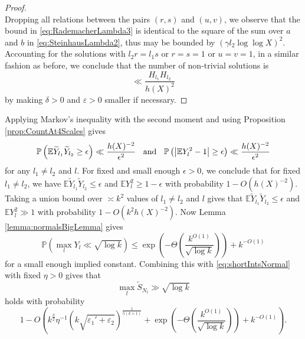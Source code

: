 \documentclass[11pt]{tran-l}
\theoremstyle{definition}
\theoremstyle{remark}
\numberwithin{equation}{section}
\begin{document}
\begin{proof}
\begin{equation}
     \end{equation}
     Dropping all relations between the pairs $(r, s)$ and $(u, v)$, we observe that the bound in \eqref{eq:RademacherLambda3} is identical to the square of the sum over $a$ and $b$ in \eqref{eq:SteinhausLambda2}, thus may be bounded by $(\gamma l_2\log\log X)^2$. Accounting for the solutions with $l_2r=l_1s$ or $r=s=1$ or $u=v=1$, in a similar fashion as before, we conclude that the number of non-trivial solutions is 
     \begin{equation}
         \ll \frac{H_{l_1}H_{l_2}}{h(X)^2}
     \end{equation} by making $\delta>0$ and $\varepsilon>0$ smaller if necessary. 
    \end{proof}

 Applying Markov's inequality with the second moment and using Proposition \ref{prop:CountAt4Scales} gives
    \begin{equation*}
        \mathbb P\left(\mathbb E\widetilde{Y}_{l_1}\widetilde{Y}_{l_2}\geq \epsilon \right)\ll \frac{h(X)^{-2}}{\epsilon^2} \hspace{0.2cm}\text{ and }\hspace{0.2cm} \mathbb P\left(\left\lvert \mathbb EY_l^2-1\right\rvert\geq\epsilon \right)\ll \frac{h(X)^{-2}}{\epsilon^2}
    \end{equation*}
    for any $l_1\neq l_2$ and $l$. 
    For fixed and small enough $\epsilon >0$, we conclude that for fixed $l_1\neq l_2$, we have $\mathbb E \widetilde{Y}_{l_1}\widetilde{Y}_{l_2}\leq \epsilon$ and $\mathbb EY_l^2\geq 1-\epsilon$ with probability $1-O(h(X)^{-2}).$ Taking a union bound over $\asymp k^2$ values of $l_1\neq l_2$ and $l$ gives that $\mathbb E\widetilde{Y}_{l_1}\widetilde{Y}_{l_2}\leq \epsilon$ and $\mathbb EY_l^2\gg 1$ with probability $1- O(k^2h(X)^{-2})$. Now Lemma \ref{lemma:normalsBigLemma} gives 
    \[
\mathbb{P}\left(\max_{l} Y_l\ll \sqrt{\log k}\right) \leq  \exp\left(-\Theta\left(\frac{k^{O(1)}}{\sqrt{\log k}}\right)\right) + k^{-O(1)}
\]
for a small enough implied constant. Combining this with \eqref{eq:shortIntsNormal} with fixed $\eta>0$ gives that
\begin{equation*}\label{eq:shortIntsNormal2}
\max_l \widetilde{S}_{N_l} \gg \sqrt{\log k}
\end{equation*}
holds with probability 
\begin{equation*}
    1- O\left(k^{\frac{3}{2}}\eta^{-1} \left(k\sqrt{\varepsilon_1' + \varepsilon_2}\right)^{\frac1{5(k+1)}}  + \exp\left(-\Theta\left(\frac{k^{O(1)}}{\sqrt{\log k}}\right)\right) + k^{-O(1)}\right).
\end{equation*}
\end{document}

